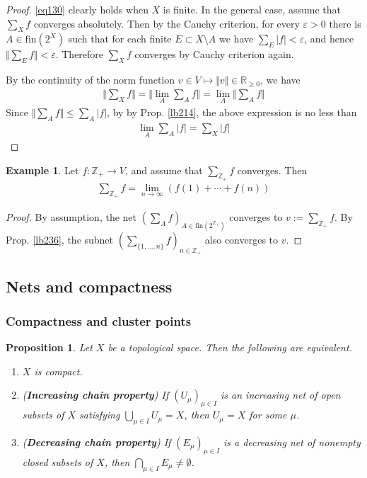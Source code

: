 \documentclass[12pt,b5paper,notitlepage]{article}
\theoremstyle{definition}
\newtheorem{eg}[df]{Example}
\theoremstyle{plain}
\newtheorem{pp}[df]{Proposition}
\newcommand{\Zbb}{\mathbb Z}
\newcommand{\Rbb}{\mathbb R}
\newcommand{\fin}{\mathrm{fin}}
\newcommand{\eps}{\varepsilon}
\numberwithin{equation}{section}
\begin{document}
\begin{proof}
\eqref{eq130} clearly holds when $X$ is finite. In the general case, assume that $\sum_Xf $ converges absolutely. Then by the Cauchy criterion, for every $\eps>0$ there is $A\in \fin(2^X)$ such that for each finite $E\subset X\setminus A$ we have $\sum_E|f|<\eps$, and hence $\Vert \sum_E f\Vert<\eps$. Therefore $\sum_Xf$ converges by Cauchy criterion again.

By the continuity of the norm function $v\in V\mapsto \Vert v\Vert\in\Rbb_{\geq0}$, we have
\begin{align*}
\Big\Vert \sum_X f \Big\Vert=\Big\Vert \lim_A \sum_Af \Big\Vert=\lim_A \Big\Vert \sum_Af \Big\Vert
\end{align*}
Since $\Vert \sum_A f\Vert\leq\sum_A|f|$, by by Prop. \ref{lb214}, the above expression is no less than
\begin{align*}
\lim_A\sum_A|f|=\sum_X|f|
\end{align*}
\end{proof}



\begin{eg}
Let $f:\Zbb_+\rightarrow V$, and assume that $\sum_{\Zbb_+}f$ converges. Then
\begin{align*}
\sum_{\Zbb_+}f=\lim_{n\rightarrow\infty} (f(1)+\cdots+f(n))
\end{align*}
\end{eg}

\begin{proof}
By assumption, the net $(\sum_Af)_{A\in\fin(2^{\Zbb_+})}$ converges to $v:=\sum_{\Zbb_+}f$. By Prop. \ref{lb236}, the subnet $(\sum_{\{1,\dots,n\}}f)_{n\in\Zbb_+}$ also converges to $v$.
\end{proof}







\subsection{Nets and compactness}

\subsubsection{Compactness and cluster points}\label{lb229}


\begin{pp}\label{lb215}
Let $X$ be a topological space. Then the following are equivalent.
\begin{enumerate}[label=(\arabic*)]
\item $X$ is compact.
\item (\textbf{Increasing chain property}) If $(U_\mu)_{\mu\in I}$ is an increasing net of open subsets of $X$ satisfying $\bigcup_{\mu\in I}U_\mu=X$, then $U_\mu=X$ for some $\mu$.
\item (\textbf{Decreasing chain property}) If $(E_\mu)_{\mu\in I}$ is a decreasing net of nonempty closed subsets of $X$, then $\bigcap_{\mu\in I}E_\mu\neq\emptyset$.
\end{enumerate}
\end{pp}
\end{document}
